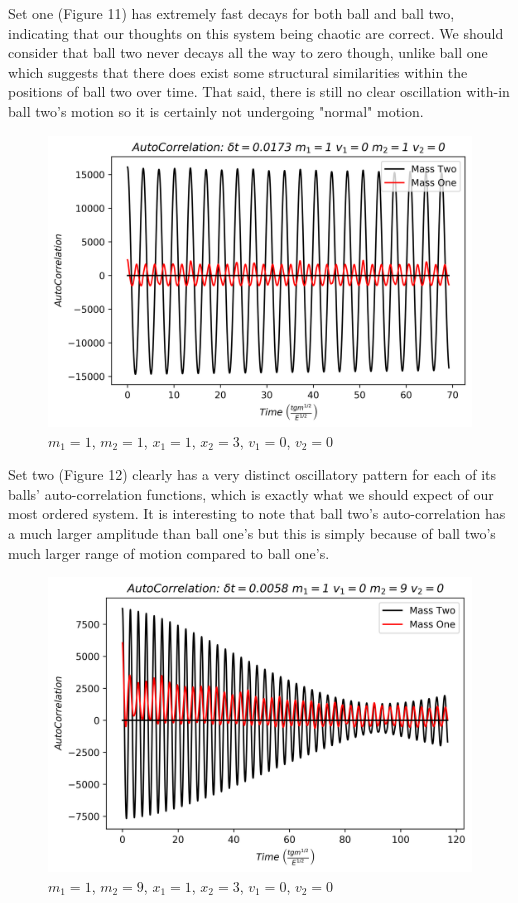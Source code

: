 \documentclass[twocolumn]{article}
\begin{document}
\hspace{-3.8mm}Set one (Figure 11) has extremely fast decays for both ball and ball two, indicating that our thoughts on this system being chaotic are correct. We should consider that ball two never decays all the way to zero though, unlike ball one which suggests that there does exist some structural similarities within the positions of ball two over time. That said, there is still no clear oscillation with-in ball two's motion so it is certainly not undergoing "normal" motion. \\
\begin{figure}[H]
\caption{$m_1=1$, $m_2=1$, $x_1=1$, $x_2=3$, $v_1=0$, $v_2=0$}
\centering
\includegraphics[scale=.45]{Correlation-2-v2}
\end{figure}
\hspace{-3.8mm}Set two (Figure 12) clearly has a very distinct oscillatory pattern for each of its balls' auto-correlation functions, which is exactly what we should expect of our most ordered system. It is interesting to note that ball two's auto-correlation has a much larger amplitude than ball one's but this is simply because of ball two's much larger range of motion compared to ball one's. \\
\begin{figure}[H]
\caption{$m_1=1$, $m_2=9$, $x_1=1$, $x_2=3$, $v_1=0$, $v_2=0$}
\centering
\includegraphics[scale=.45]{Correlation-3-6}
\end{figure}
\end{document}
